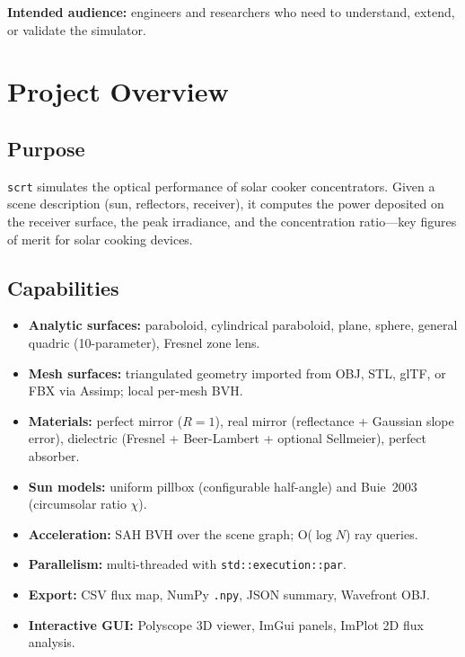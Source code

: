 \documentclass[12pt,a4paper]{report}
\begin{document}
\textbf{Intended audience:} engineers and researchers who need to understand, extend, or
validate the simulator.

\tableofcontents

\chapter{Project Overview}

\section{Purpose}
\texttt{scrt} simulates the optical performance of solar cooker concentrators.  Given a
scene description (sun, reflectors, receiver), it computes the power deposited on the
receiver surface, the peak irradiance, and the concentration ratio—key figures of merit for
solar cooking devices.

\section{Capabilities}
\begin{itemize}
  \item \textbf{Analytic surfaces:} paraboloid, cylindrical paraboloid, plane, sphere,
        general quadric (10-parameter), Fresnel zone lens.
  \item \textbf{Mesh surfaces:} triangulated geometry imported from OBJ, STL, glTF, or FBX
        via Assimp; local per-mesh BVH.
  \item \textbf{Materials:} perfect mirror ($R=1$), real mirror (reflectance + Gaussian slope
        error), dielectric (Fresnel + Beer-Lambert + optional Sellmeier), perfect absorber.
  \item \textbf{Sun models:} uniform pillbox (configurable half-angle) and Buie~2003
        (circumsolar ratio $\chi$).
  \item \textbf{Acceleration:} SAH BVH over the scene graph; O($\log N$) ray queries.
  \item \textbf{Parallelism:} multi-threaded with \texttt{std::execution::par}.
  \item \textbf{Export:} CSV flux map, NumPy \texttt{.npy}, JSON summary, Wavefront OBJ.
  \item \textbf{Interactive GUI:} Polyscope 3D viewer, ImGui panels, ImPlot 2D flux analysis.
\end{itemize}
\end{document}
